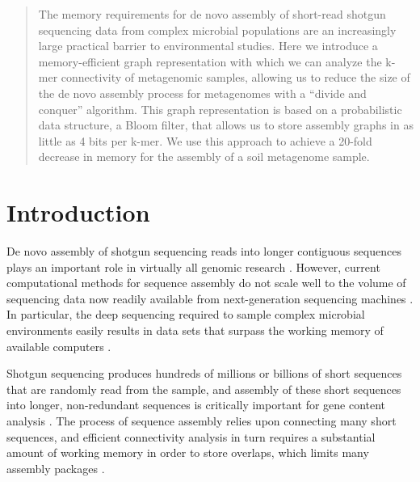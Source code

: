 \documentclass{pnastwo}
\begin{document}
\begin{article}

\begin{abstract}

The memory requirements for de novo assembly of short-read shotgun
sequencing data from complex microbial populations are an increasingly
large practical barrier to environmental studies.  Here we introduce a
memory-efficient graph representation with which we can analyze the
k-mer connectivity of metagenomic samples, allowing us to reduce the
size of the de novo assembly process for metagenomes with a ``divide and
conquer'' algorithm.  This graph representation is based on a
probabilistic data structure, a Bloom filter, that allows us to store
assembly graphs in as little as 4 bits per k-mer.  We use this
approach to achieve a 20-fold decrease in memory for the assembly of a
soil metagenome sample.

\end{abstract}


\section{Introduction}



De novo assembly of shotgun sequencing reads into longer contiguous
sequences plays an important role in virtually all genomic research
\cite{pubmed19482960}.
However, current computational methods for sequence assembly do not
scale well to the volume of sequencing data now readily available from
next-generation sequencing machines \cite{pubmed19482960,pubmed22147368}.  In particular, the deep
sequencing required to sample complex microbial environments easily
results in data sets that surpass the working memory of available
computers \cite{metahit,rumen}.

Shotgun sequencing produces hundreds of millions or billions of short
sequences that are randomly read from the sample, and assembly of
these short sequences into longer, non-redundant sequences is
critically important for gene content analysis \cite{pubmed19482960}.  The process of
sequence assembly relies upon connecting many short
sequences, and efficient connectivity analysis in turn requires a
substantial amount of working memory in order to store overlaps,
which limits many assembly packages \cite{pubmed22147368}.


\end{article}
\end{document}
